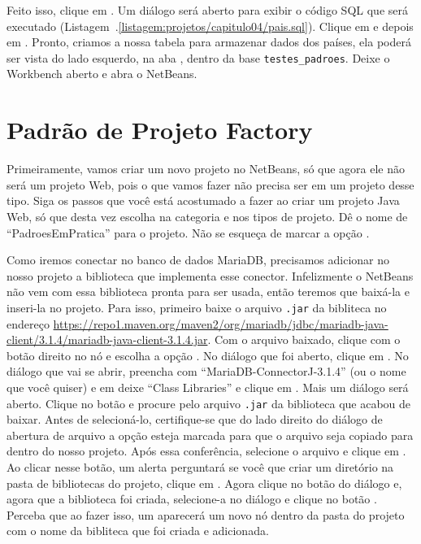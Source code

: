 Feito isso, clique em . Um diálogo será aberto para exibir o código SQL que será executado (Listagem~\thechapter.\ref{listagem:projetos/capitulo04/pais.sql}). Clique em  e depois em . Pronto, criamos a nossa tabela para armazenar dados dos países, ela poderá ser vista do lado esquerdo, na aba , dentro da base \texttt{testes\_padroes}. Deixe o Workbench aberto e abra o NetBeans. 


\section{Padrão de Projeto Factory}

Primeiramente, vamos criar um novo projeto no NetBeans, só que agora ele não será um projeto Web, pois o que vamos fazer não precisa ser em um projeto desse tipo. Siga os passos que você está acostumado a fazer ao criar um projeto Java Web, só que desta vez escolha  na categoria e  nos tipos de projeto. Dê o nome de ``PadroesEmPratica'' para o projeto. Não se esqueça de marcar a opção .

Como iremos conectar no banco de dados MariaDB, precisamos adicionar no nosso projeto a biblioteca que implementa esse conector. Infelizmente o NetBeans não vem com essa biblioteca pronta para ser usada, então teremos que baixá-la e inseri-la no projeto. Para isso, primeiro baixe o arquivo \texttt{.jar} da bibliteca no endereço \url{https://repo1.maven.org/maven2/org/mariadb/jdbc/mariadb-java-client/3.1.4/mariadb-java-client-3.1.4.jar}. Com o arquivo baixado, clique com o botão direito no nó  e escolha a opção . No diálogo que foi aberto, clique em . No diálogo que vai se abrir, preencha  com ``MariaDB-ConnectorJ-3.1.4'' (ou o nome que você quiser) e em  deixe ``Class Libraries'' e clique em . Mais um diálogo será aberto. Clique no botão  e procure pelo arquivo \texttt{.jar} da biblioteca que acabou de baixar. Antes de selecioná-lo, certifique-se que do lado direito do diálogo de abertura de arquivo a opção  esteja marcada para que o arquivo seja copiado para dentro do nosso projeto. Após essa conferência, selecione o arquivo e clique em . Ao clicar nesse botão, um alerta perguntará se você que criar um diretório na pasta de bibliotecas do projeto, clique em . Agora clique no botão  do diálogo  e, agora que a biblioteca foi criada, selecione-a no diálogo  e clique no botão . Perceba que ao fazer isso, um aparecerá um novo nó dentro da pasta  do projeto com o nome da bibliteca que foi criada e adicionada.

